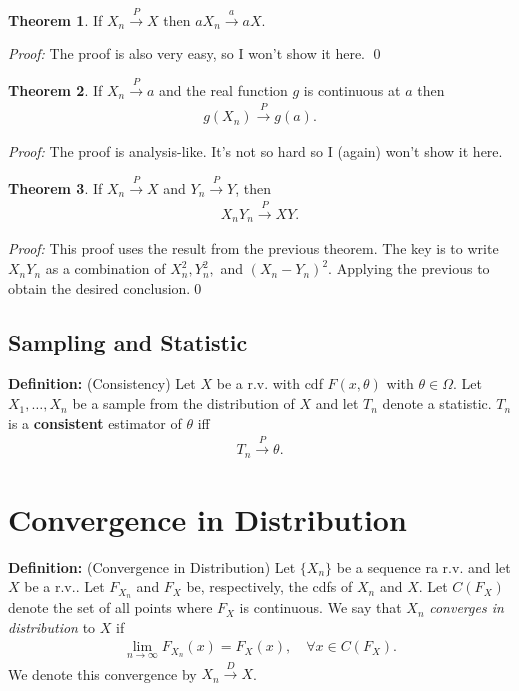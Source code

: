 \documentclass{book}
\theoremstyle{definition}
\newtheorem{thm}{Theorem}[section]
\begin{document}
\begin{thm} 
	If $X_n \xrightarrow{P} X$ then $aX_n \xrightarrow{a} aX$. 
\end{thm}

\noindent\textit{Proof:} The proof is also very easy, so I won't show it here. \qed



\begin{thm} If $X_n \xrightarrow{P} a$ and the real function $g$ is continuous at $a$ then 
\begin{align}
g(X_n) \xrightarrow{P} g(a).
\end{align} 
\end{thm}
\noindent \textit{Proof:} The proof is analysis-like. It's not so hard so I (again) won't show it here.\\

\begin{thm} If $X_n \xrightarrow{P} X$ and $Y_n \xrightarrow{P} Y$, then 
\begin{align}
X_n Y_n \xrightarrow{P} XY.
\end{align} 
\end{thm}
\noindent \textit{Proof:} This proof uses the result from the previous theorem. The key is to write $X_n Y_n$ as a combination of $X_n^2, Y_n^2,$ and $(X_n - Y_n)^2$. Applying the previous to obtain the desired conclusion.\qed


\subsection{Sampling and Statistic}


\noindent \textbf{Definition:} (Consistency) Let $X$ be a r.v. with cdf $F(x,\theta)$ with $\theta \in \Omega$. Let $X_1, \dots, X_n$ be a sample from the distribution of $X$ and let $T_n$ denote a statistic. $T_n$ is a \textbf{consistent} estimator of $\theta$ iff
\begin{align}
T_n \xrightarrow{P} \theta.
\end{align}



\section{Convergence in Distribution}


\noindent \textbf{Definition:} (Convergence in Distribution) Let $\{X_n\}$ be a sequence ra r.v. and let $X$ be a r.v.. Let $F_{X_n}$ and $F_X$ be, respectively, the cdfs of $X_n$ and $X$. Let $C(F_X)$ denote the set of all points where $F_X$ is continuous. We say that $X_n$ \textit{converges in distribution} to $X$ if
\begin{align}
\lim_{n\to \infty} F_{X_n}(x) = F_X(x), \quad \forall x\in C(F_X).
\end{align}
We denote this convergence by $X_n \xrightarrow{D} X$. \\
\end{document}
